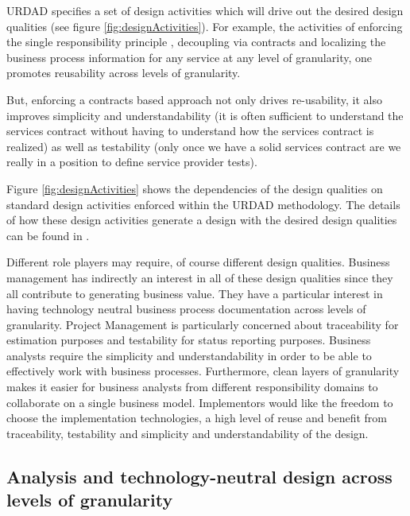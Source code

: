 \documentclass{IOS-Book-Article}
\begin{document}
URDAD specifies a set of design activities which will drive out the desired
design qualities (see figure \ref{fig:designActivities}).
For example, the activities of enforcing the single
responsibility principle \cite{wirfs-brock:objectDesign,
wirfs-brock:responsibilityDrivenApproach}, decoupling via contracts
\cite{meyer:designByContract} and localizing the business process information
for any service at any level of granularity, one promotes reusability across
levels of granularity.

But, enforcing a contracts based approach not only drives re-usability, it also
improves simplicity and understandability (it is often sufficient to understand the
services contract without having to understand how the services contract is
realized) as well as testability (only once we have a solid services contract are we
really in a position to define service provider tests).

Figure \ref{fig:designActivities} shows the dependencies of the design qualities on
standard design activities enforced within the URDAD methodology. The details of
how these design activities generate a design with the desired design qualities
can be found in \cite{solms:urdad}.

Different role players may require, of course different design qualities. Business
management has indirectly an interest in all of these design qualities since they
all contribute to generating business value. They have a particular interest in
having technology neutral business process documentation across levels of granularity.
Project Management is particularly
concerned about traceability for estimation purposes and testability for status
reporting purposes. Business analysts require the simplicity and understandability
in order to be able to effectively work with business processes. Furthermore, clean
layers of granularity makes it easier for business analysts from different responsibility
domains to collaborate on a single business model. Implementors would like the freedom
to choose the implementation technologies, a high level of reuse and benefit from traceability,
testability and simplicity and understandability of the design.


\subsection{Analysis and technology-neutral design across levels of granularity}
\end{document}
